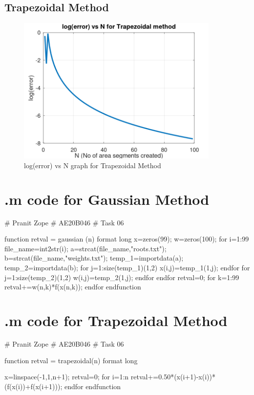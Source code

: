 \documentclass[12pt]{article}
\begin{document}
\subsection{Trapezoidal Method}
\begin{figure}[H]
    \centering
    \includegraphics[width=10cm]{errt.png}
    \caption{log(error) vs N graph for Trapezoidal Method}
\end{figure}

\newpage
\appendix
{}

\section{.m code for Gaussian Method}
\begin{python}
# Pranit Zope
# AE20B046
# Task 06

function retval = gaussian (n)
format long
x=zeros(99);
w=zeros(100);
for i=1:99
file_name=int2str(i);
a=strcat(file_name,"roots.txt");
b=strcat(file_name,"weights.txt");
temp_1=importdata(a);
temp_2=importdata(b);
  for j=1:size(temp_1)(1,2)
    x(i,j)=temp_1(1,j);
  endfor
  for j=1:size(temp_2)(1,2)
      w(i,j)=temp_2(1,j); 
endfor
endfor
retval=0;
for k=1:99
  retval+=w(n,k)*f(x(n,k));
endfor
endfunction

\end{python}

\section{.m code for Trapezoidal Method}
\begin{python}
# Pranit Zope
# AE20B046
# Task 06

function retval = trapezoidal(n)
format long

x=linspace(-1,1,n+1);
retval=0;
for i=1:n
  retval+=0.50*(x(i+1)-x(i))*(f(x(i))+f(x(i+1)));
endfor
endfunction
\end{python}
\end{document}
